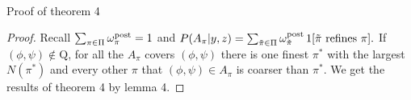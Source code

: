 \documentclass[aoas,preprint]{imsart}
\begin{document}







\hfill\\
Proof of theorem 4 
\begin{proof}

Recall $\sum_{\pi \in \Pi} \omega^{\rm post}_{ \pi} = 1$ and $P(A_\pi|y,z) = 
\sum_{\tilde \pi \in \Pi} \omega^{\rm post}_{\tilde \pi} \,  1[ {\mbox {\rm $\tilde \pi$ refines $\pi$}} ].$  If $(\phi, \psi) \notin \text{Q}$, for all the $A_\pi$ covers $(\phi, \psi)$ there is one finest $\pi^*$ with the largest $N(\pi^*)$ and every other $\pi$ that $(\phi,\psi) \in A_\pi$ is coarser than $\pi^*$. We get the results of theorem 4 by lemma 4.


\end{proof}
\end{document}
